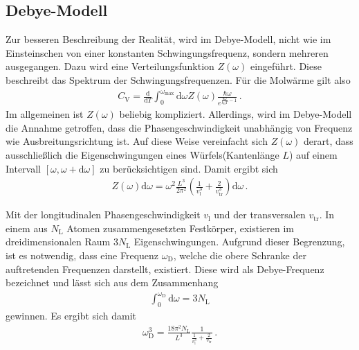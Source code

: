 \subsection{Debye-Modell}
\label{subsec:debye}
Zur besseren Beschreibung der Realität, wird im Debye-Modell,
nicht wie im Einsteinschen von einer konstanten Schwingungsfrequenz,
sondern mehreren ausgegangen.
Dazu wird eine Verteilungsfunktion $Z(\omega)$ eingeführt.
Diese beschreibt das Spektrum der Schwingungsfrequenzen.
Für die Molwärme gilt also
\begin{align}
	C_{\text{V}} = \frac{\mathrm{d}}{\mathrm{d}T}
	\int_{0}^{\omega_{\text{max}}} \mathrm{d}\omega Z(\omega)
	\frac{\hbar \omega}{e^{\frac{\hbar \omega}{k_{\text{B}} T} - 1}} \, . \label{eqn:t9}
\end{align}
Im allgemeinen ist $Z(\omega)$  beliebig kompliziert.
Allerdings, wird im Debye-Modell die Annahme getroffen,
dass die Phasengeschwindigkeit unabhängig von Frequenz wie
Ausbreitungsrichtung ist.
Auf diese Weise vereinfacht sich $Z(\omega)$ derart, dass
ausschließlich die Eigenschwingungen eines Würfels(Kantenlänge $L$)
auf einem Intervall $\left[ \omega, \omega + \mathrm{d}\omega \right]$
zu berücksichtigen sind.
Damit ergibt sich
\begin{align}
	Z(\omega) \mathrm{d}\omega =  \omega^{2} \frac{L^{3}}{2 \pi^{2}}
	\left( \frac{1}{v_{\text{l}}^{3}} +
	\frac{2}{v_{\text{tr}}^{3}} \right) \mathrm{d}\omega \, . \label{eqn:t10}
\end{align}

Mit der longitudinalen Phasengeschwindigkeit $v_{\text{l}}$
und der transversalen $v_{\text{tr}}$.
In einem aus $N_{\text{L}}$ Atomen zusammengesetzten Festkörper,
existieren im dreidimensionalen Raum $3N_{\text{L}}$ Eigenschwingungen.
Aufgrund dieser Begrenzung, ist es notwendig, dass eine
Frequenz $\omega_{\text{D}}$, welche die obere Schranke der auftretenden
Frequenzen darstellt, existiert.
Diese wird als Debye-Frequenz bezeichnet und lässt sich
aus dem Zusammenhang
\begin{align}
	\int_{0}^{\omega_{\text{D}}} \mathrm{d}\omega = 3 N_{\text{L}} \label{eqn:t11}
\end{align}
gewinnen.
Es ergibt sich damit
\begin{align}
	\omega_{\text{D}}^{3} = \frac{18 \pi^{2} N_{\text{L}}}{L^{3}}
	\frac{1}{\frac{1}{v_{\text{l}}^{3}} + \frac{2}{v_{\text{tr}}}} \, .\label{eqn:t12}
\end{align}

